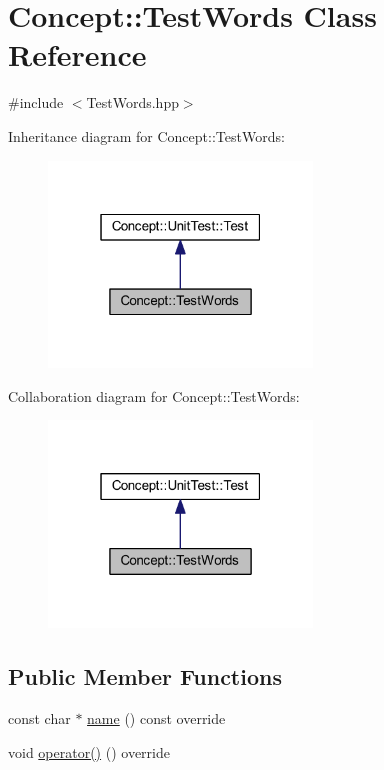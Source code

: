 \hypertarget{class_concept_1_1_test_words}{}\section{Concept\+::Test\+Words Class Reference}
\label{class_concept_1_1_test_words}


{\ttfamily \#include $<$Test\+Words.\+hpp$>$}



Inheritance diagram for Concept\+::Test\+Words\+:\nopagebreak
\begin{figure}[H]
\begin{center}
\leavevmode
\includegraphics[width=199pt]{class_concept_1_1_test_words__inherit__graph}
\end{center}
\end{figure}


Collaboration diagram for Concept\+::Test\+Words\+:\nopagebreak
\begin{figure}[H]
\begin{center}
\leavevmode
\includegraphics[width=199pt]{class_concept_1_1_test_words__coll__graph}
\end{center}
\end{figure}
\subsection*{Public Member Functions}
\begin{DoxyCompactItemize}
\item 
const char $\ast$ \mbox{\hyperlink{class_concept_1_1_test_words_a1466d72428143b610937c692545de6f3}{name}} () const override
\item 
void \mbox{\hyperlink{class_concept_1_1_test_words_ac268229701b31e0aab5764227b9cdf0b}{operator()}} () override
\end{DoxyCompactItemize}
